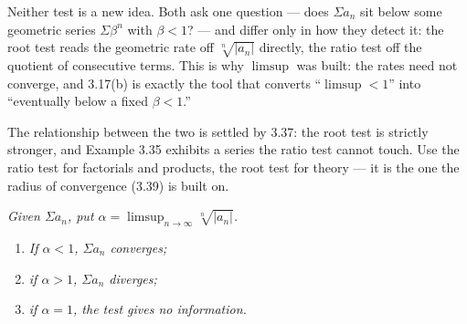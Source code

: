 
\begin{signpost}
Neither test is a new idea. Both ask one question --- does $\Sigma a_n$ sit
below some geometric series $\Sigma\beta^n$ with $\beta < 1$? --- and differ
only in how they detect it: the root test reads the geometric rate off
$\sqrt[n]{|a_n|}$ directly, the ratio test off the quotient of consecutive
terms. This is why $\limsup$ was built: the rates need not converge, and
3.17(b) is exactly the tool that converts ``$\limsup < 1$'' into ``eventually
below a fixed $\beta < 1$.''

\smallskip
The relationship between the two is settled by 3.37: the root test is
strictly stronger, and Example 3.35 exhibits a series the ratio test cannot
touch. Use the ratio test for factorials and products, the root test for
theory --- it is the one the radius of convergence (3.39) is built on.
\end{signpost}

\emph{Given $\Sigma a_n$, put
$\alpha = \limsup_{n\to\infty} \sqrt[n]{|a_n|}$.}
\begin{enumerate}[label=(\alph*), leftmargin=2.2em, itemsep=1pt, topsep=3pt]
  \item \emph{If $\alpha < 1$, $\Sigma a_n$ converges;}
  \item \emph{if $\alpha > 1$, $\Sigma a_n$ diverges;}
  \item \emph{if $\alpha = 1$, the test gives no information.}
\end{enumerate}

